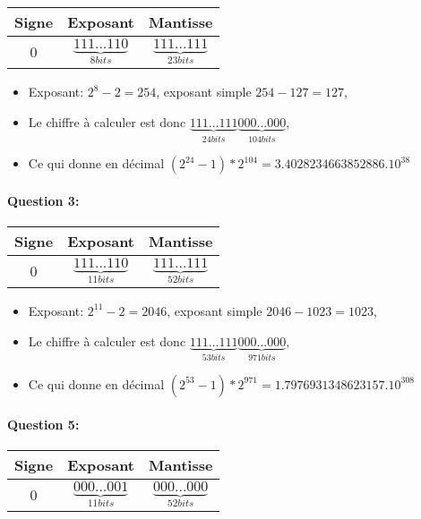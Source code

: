 \begin{center}
	\begin{tabular}{|c c c|}
	\hline
	Signe & Exposant & Mantisse \\
	\hline
	0 & $\underbrace{111...110}_{8 bits}$ & $\underbrace{111...111}_{23 bits}$ \\
	\hline
	\end{tabular}
\end{center}

\begin{itemize}
 \item Exposant: $2^8-2=254$, exposant simple $254-127=127$,
 \item Le chiffre à calculer est donc $\underbrace{111...111}_{24 bits}\underbrace{000...000}_{104 bits}$,
 \item Ce qui donne en décimal $(2^{24}-1)*2^{104}=3.4028234663852886.10^{38}$
\end{itemize}

\paragraph{Question 3:}

\begin{center}
	\begin{tabular}{|c c c|}
	\hline
	Signe & Exposant & Mantisse \\
	\hline
	0 & $\underbrace{111...110}_{11 bits}$ & $\underbrace{111...111}_{52 bits}$ \\
	\hline
	\end{tabular}
\end{center}

\begin{itemize}
 \item Exposant: $2^{11}-2=2046$, exposant simple $2046-1023=1023$,
 \item Le chiffre à calculer est donc $\underbrace{111...111}_{53 bits}\underbrace{000...000}_{971 bits}$,
 \item Ce qui donne en décimal $(2^{53}-1)*2^{971}=1.7976931348623157.10^{308}$
\end{itemize}

\paragraph{Question 5:}

\begin{center}
	\begin{tabular}{|c c c|}
	\hline
	Signe & Exposant & Mantisse \\
	\hline
	0 & $\underbrace{000...001}_{11 bits}$ & $\underbrace{000...000}_{52 bits}$ \\
	\hline
	\end{tabular}
\end{center}

